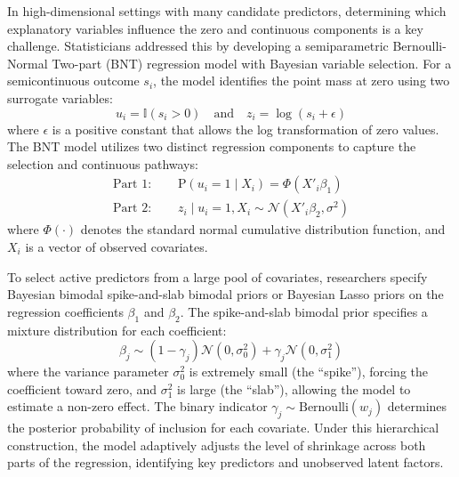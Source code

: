 \documentclass[11pt, a4paper]{article}
\begin{document}
In high-dimensional settings with many candidate predictors, determining which explanatory variables influence the zero and continuous components is a key challenge.\cite{min2002, george1993, ishwaran2005} Statisticians addressed this by developing a semiparametric Bernoulli-Normal Two-part (BNT) regression model with Bayesian variable selection.\cite{min2002, george1993, ishwaran2005} For a semicontinuous outcome $s_i$, the model identifies the point mass at zero using two surrogate variables:
\begin{equation}
u_i = \mathbb{I}(s_i > 0) \quad \text{and} \quad z_i = \log(s_i + \epsilon)
\end{equation}
where $\epsilon$ is a positive constant that allows the log transformation of zero values.\cite{ishwaran2005} The BNT model utilizes two distinct regression components to capture the selection and continuous pathways:
\begin{align}
\text{Part 1: } \quad & \text{P}(u_i = 1 \mid X_i) = \Phi(X'_i \beta_1) \\
\text{Part 2: } \quad & z_i \mid u_i = 1, X_i \sim \mathcal{N}(X'_i \beta_2, \sigma^2)
\end{align}
where $\Phi(\cdot)$ denotes the standard normal cumulative distribution function, and $X_i$ is a vector of observed covariates.\cite{min2002, ishwaran2005} 

To select active predictors from a large pool of covariates, researchers specify Bayesian bimodal spike-and-slab bimodal priors or Bayesian Lasso priors on the regression coefficients $\beta_1$ and $\beta_2$.\cite{george1993, ishwaran2005} The spike-and-slab bimodal prior specifies a mixture distribution for each coefficient:
\begin{equation}
\beta_j \sim (1 - \gamma_j) \mathcal{N}(0, \sigma_0^2) + \gamma_j \mathcal{N}(0, \sigma_1^2)
\end{equation}
where the variance parameter $\sigma_0^2$ is extremely small (the ``spike''), forcing the coefficient toward zero, and $\sigma_1^2$ is large (the ``slab''), allowing the model to estimate a non-zero effect.\cite{george1993, ishwaran2005} The binary indicator $\gamma_j \sim \text{Bernoulli}(w_j)$ determines the posterior probability of inclusion for each covariate.\cite{george1993, ishwaran2005} Under this hierarchical construction, the model adaptively adjusts the level of shrinkage across both parts of the regression, identifying key predictors and unobserved latent factors.\cite{george1993, ishwaran2005}
\end{document}

